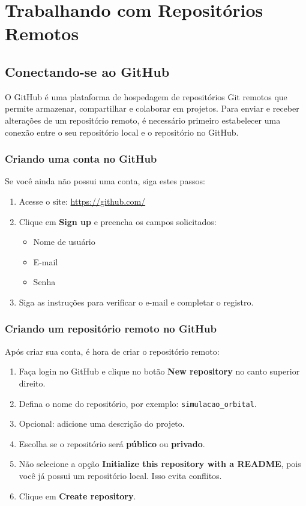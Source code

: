 \newpage
\section{Trabalhando com Repositórios Remotos}
\subsection{Conectando-se ao GitHub}

O GitHub é uma plataforma de hospedagem de repositórios Git remotos que permite armazenar, compartilhar e colaborar em projetos. Para enviar e receber alterações de um repositório remoto, é necessário primeiro estabelecer uma conexão entre o seu repositório local e o repositório no GitHub.

\subsubsection*{Criando uma conta no GitHub}

Se você ainda não possui uma conta, siga estes passos:

\begin{enumerate}
    \item Acesse o site: \url{https://github.com/}
    \item Clique em \textbf{Sign up} e preencha os campos solicitados:
    \begin{itemize}
        \item Nome de usuário
        \item E-mail
        \item Senha
    \end{itemize}
    \item Siga as instruções para verificar o e-mail e completar o registro.
\end{enumerate}

\subsubsection*{Criando um repositório remoto no GitHub}

Após criar sua conta, é hora de criar o repositório remoto:

\begin{enumerate}
    \item Faça login no GitHub e clique no botão \textbf{New repository} no canto superior direito.
    \item Defina o nome do repositório, por exemplo: \texttt{simulacao\_orbital}.
    \item Opcional: adicione uma descrição do projeto.
    \item Escolha se o repositório será \textbf{público} ou \textbf{privado}.
    \item Não selecione a opção \textbf{Initialize this repository with a README}, pois você já possui um repositório local. Isso evita conflitos.
    \item Clique em \textbf{Create repository}.
\end{enumerate}


